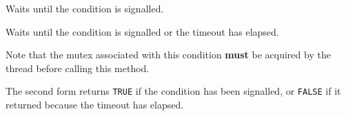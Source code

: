 
Waits until the condition is signalled.


Waits until the condition is signalled or the timeout has elapsed.

Note that the mutex associated with this condition {\bf must} be acquired by
the thread before calling this method.





The second form returns {\tt TRUE} if the condition has been signalled, or
{\tt FALSE} if it returned because the timeout has elapsed.


